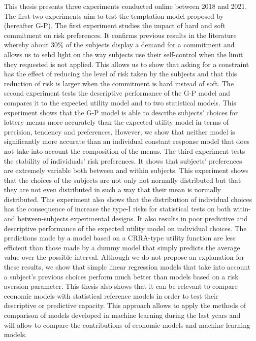 \documentclass[
]{book}
\begin{document}
This thesis presents three experiments conducted online between 2018 and 2021.
The first two experiments aim to test the temptation model proposed by
\citet{gul2001temptation} (hereafter G-P).
The first experiment studies the impact of hard and soft commitment on risk
preferences.
It confirms previous results in the literature whereby
about 30\% of the subjects display a demand for a commitment and
allows us to sehd light on the way subjects use their self-control when the limit they
requested is not applied.
This allows us to show that asking for a constraint has the effect of reducing
the level of risk taken by the subjects and that this reduction of risk is
larger when the commitment is hard instead of soft.
The second experiment tests the descriptive performance of the G-P model and
compares it to the expected utility model and to two statistical models.
This experiment shows that the G-P model is able to describe subjects' choices
for lottery menus more accurately than the expected utility model in terms of
precision, tendency and preferences.
However, we show that neither model is significantly more accurate than an
individual constant response model that does not take into account the
composition of the menus.
The third experiment tests the stability of individuals' risk preferences.
It shows that subjects' preferences are extremely variable both between and
within subjects.
This experiment shows that the choices of the subjects are not only not normally
distributed but that they are not even distributed in such a way that their mean
is normally distributed.
This experiment also shows that the distribution of individual choices has the
consequence of increase the type-I risks for statistical tests on both witin- and between-subjects experimental
designs.
It also results in poor predictive and descriptive performance of the expected
utility model on individual choices.
The predictions made by a model based on a CRRA-type utility function are less
efficient than those made by a dummy model that simply predicts the average
value over the possible interval.
Although we do not propose an explanation for these results, we show that simple
linear regression models that take into account a subject's previous choices
perform much better than models based on a risk aversion parameter.
This thesis also shows that it can be relevant to compare economic models
with statistical reference models in order to test their descriptive or
predictive capacity.
This approach allows to apply the methods of comparison of models developed in
machine learning during the last years and will allow to compare the
contributions of economic models and machine learning models.
\end{document}
